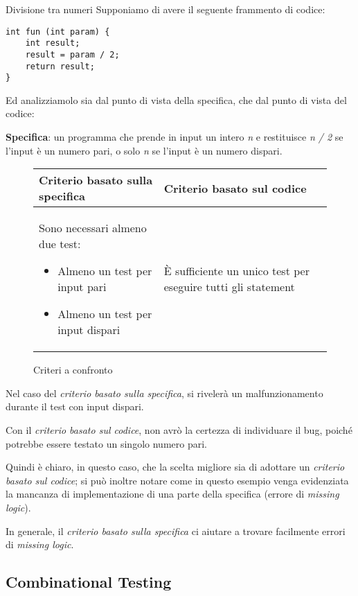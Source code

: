 \begin{example}{}{Divisione tra numeri}
    Supponiamo di avere il seguente frammento di codice:

    \begin{lstlisting}
int fun (int param) {
    int result;
    result = param / 2;
    return result;
}
    \end{lstlisting}
    Ed analizziamolo sia dal punto di vista della specifica, che dal punto di vista del codice:

    \textbf{Specifica}: un programma che prende in input un intero \textit{n} e restituisce \textit{n / 2} se l'input è un numero pari, o solo \textit{n} se l'input è un numero dispari.

    \begin{figure}[H]
    \caption{Criteri a confronto}
    \begin{center}
    \begin{tabular}{p{5cm} | p{5cm}}
        Criterio basato sulla specifica & Criterio basato sul codice \\ \hline
        Sono necessari almeno due test: \begin{itemize}
            \item Almeno un test per input pari
            \item Almeno un test per input dispari
        \end{itemize}
        & È sufficiente un unico test per eseguire tutti gli statement
    \end{tabular}
    \end{center}
    \end{figure}

    Nel caso del \textit{criterio basato sulla specifica}, si rivelerà un malfunzionamento durante il test con input dispari.

    Con il \textit{criterio basato sul codice}, non avrò la certezza di individuare il bug, poiché potrebbe essere testato un singolo numero pari.

    Quindi è chiaro, in questo caso, che la scelta migliore sia di adottare un \textit{criterio basato sul codice}; si può inoltre notare come in questo esempio venga evidenziata la mancanza di implementazione di una parte della specifica (errore di \textit{missing logic}).

    In generale, il \textit{criterio basato sulla specifica} ci aiutare a trovare facilmente errori di \textit{missing logic}.
\end{example}

\subsection{Combinational Testing}

